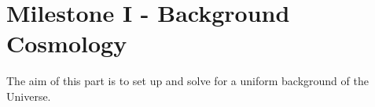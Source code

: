 \section{Milestone I - Background Cosmology}\label{sec:m1}

The aim of this part is to set up and solve for a uniform background of the Universe. 



